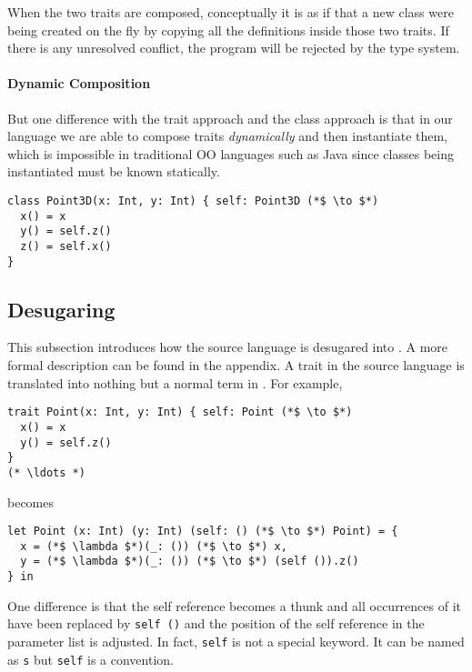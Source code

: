 When the two traits are composed, conceptually it is as if that a new class were
being created on the fly by copying all the definitions inside those two traits.
If there is any unresolved conflict, the program will be rejected by the type
system. 

\paragraph{Dynamic Composition}
But one difference with the trait approach and the class approach is
that in our language we are able to compose traits \emph{dynamically} and then
instantiate them, which is impossible in traditional OO languages such as Java
since classes being instantiated must be known statically.



\begin{lstlisting}
class Point3D(x: Int, y: Int) { self: Point3D (*$ \to $*)
  x() = x
  y() = self.z()
  z() = self.x()
}
\end{lstlisting}

\subsection{Desugaring}

This subsection introduces how the source language is desugared into \name. A
more formal description can be found in the appendix. A trait in the source
language is translated into nothing but a normal term in \name. For example,

\begin{lstlisting}
trait Point(x: Int, y: Int) { self: Point (*$ \to $*)
  x() = x
  y() = self.z()
}
(* \ldots *)
\end{lstlisting}

becomes

\begin{lstlisting}
let Point (x: Int) (y: Int) (self: () (*$ \to $*) Point) = {
  x = (*$ \lambda $*)(_: ()) (*$ \to $*) x,
  y = (*$ \lambda $*)(_: ()) (*$ \to $*) (self ()).z()
} in
\end{lstlisting}

One difference is that the self reference becomes a thunk and all occurrences of
it have been replaced by \lstinline$self ()$ and the position of the self
reference in the parameter list is adjusted. In fact, \lstinline$self$ is not a
special keyword. It can be named as \lstinline$s$ but \lstinline$self$ is a
convention.

